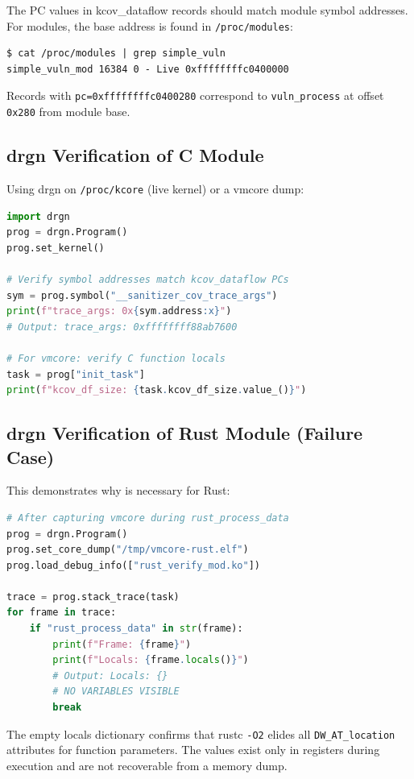 \documentclass{ndss}
\begin{document}
The PC values in kcov\_dataflow records should match module symbol addresses.
For modules, the base address is found in \texttt{/proc/modules}:
\begin{lstlisting}[numbers=none]
$ cat /proc/modules | grep simple_vuln
simple_vuln_mod 16384 0 - Live 0xffffffffc0400000
\end{lstlisting}

Records with \texttt{pc=0xffffffffc0400280} correspond to
\texttt{vuln\_process} at offset \texttt{0x280} from module base.

\subsection{drgn Verification of C Module}

Using drgn on \texttt{/proc/kcore} (live kernel) or a vmcore dump:
\begin{lstlisting}[language=Python,numbers=none]
import drgn
prog = drgn.Program()
prog.set_kernel()

# Verify symbol addresses match kcov_dataflow PCs
sym = prog.symbol("__sanitizer_cov_trace_args")
print(f"trace_args: 0x{sym.address:x}")
# Output: trace_args: 0xffffffff88ab7600

# For vmcore: verify C function locals
task = prog["init_task"]
print(f"kcov_df_size: {task.kcov_df_size.value_()}")
\end{lstlisting}

\subsection{drgn Verification of Rust Module (Failure Case)}

This demonstrates why \toolname{} is necessary for Rust:
\begin{lstlisting}[language=Python,numbers=none]
# After capturing vmcore during rust_process_data
prog = drgn.Program()
prog.set_core_dump("/tmp/vmcore-rust.elf")
prog.load_debug_info(["rust_verify_mod.ko"])

trace = prog.stack_trace(task)
for frame in trace:
    if "rust_process_data" in str(frame):
        print(f"Frame: {frame}")
        print(f"Locals: {frame.locals()}")
        # Output: Locals: {}
        # NO VARIABLES VISIBLE
        break
\end{lstlisting}

The empty locals dictionary confirms that rustc \texttt{-O2} elides all
\texttt{DW\_AT\_location} attributes for function parameters. The values exist
only in registers during execution and are not recoverable from a memory dump.
\end{document}
